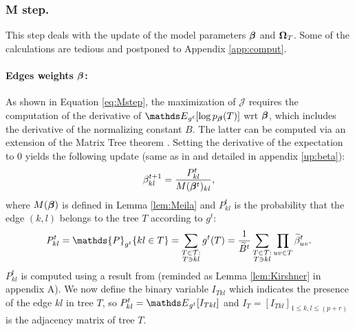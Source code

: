 \subsubsection*{M step.} This step deals with the update of the  model parameters ${\boldsymbol{\beta}}$ and ${\boldsymbol{\Omega}}_T$. Some of the calculations are tedious and postponed to Appendix \ref{app:comput}.

\paragraph{Edges weights ${\boldsymbol{\beta}}$:} 
As shown in Equation \eqref{eq:Mstep}, the maximization of $\mathcal{J}$ requires the computation of the derivative of $\Esp_{g^t} [\log p_{\betabf}(T)]$ wrt ${\boldsymbol{\beta}}$, which includes the derivative of the normalizing constant $B$. The latter can be computed via an extension of the Matrix Tree theorem \citep[see][Lemma \ref{lem:Meila} reminded in Appendix \ref{app:tools}]{MeilaJaak}. Setting the derivative of the expectation to 0 yields the following update (same as in \citet{MRA20} and detailed in appendix \ref{up:beta}):
$$
\beta^{t+1}_{kl} 
= \frac{P^t_{kl}}{ M({\boldsymbol{\beta}}^t)_{kl}},
$$
where $M({\boldsymbol{\beta}})$ is defined in Lemma \ref{lem:Meila} and $P^t_{kl}$ is the probability that the edge $(k, l)$ belongs to the tree $T$ according to $g^t$:
$$
P^t_{kl} = \mathds{P}_{g^t}\{kl \in T\} 
= \sum_{\substack{T  \in \mathcal{T}: \\ T \ni kl}} g^t(T) 
= \frac{1}{\Bt^t} \sum_{\substack{T  \in \mathcal{T}: \\ T \ni kl}} \prod_{uv \in T} \betat^t_{uv}.
$$
$P^t_{kl}$ is computed using a result from \citet{kirshner} (reminded as Lemma \ref{lem:Kirshner} in appendix A). We now define the binary variable $I_{Tkl}$ which indicates the presence of the edge $kl$ in tree $T$, so $P_{kl}^t = \Esp_{g^t} [I_{Tkl}]$ and $I_T = [I_{Tkl}]_{1 \leq k, l \leq (p+r)}$ is the adjacency matrix of tree $T$.

